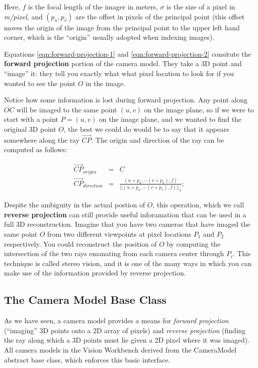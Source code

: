 Here, $f$ is the focal length of the imager in meters, $\sigma$ is the
size of a pixel in {\em m/pixel}, and $(p_u, p_v)$ are the offset in
pixels of the principal point (this offset moves the origin of the
image from the principal point to the upper left hand corner, which is
the ``origin'' usually adopted when indexing images).  

Equations \ref{eqn:forward-projection-1} and
\ref{eqn:forward-projection-2} consitute the {\bf forward projection}
portion of the camera model.  They take a 3D point and ``image'' it:
they tell you exactly what what pixel location to look for if you
wanted to see the point $O$ in the image.  

Notice how some information is lost during forward projection.  Any
point along $\overline{OC}$ will be imaged to the same point $(u,v)$
on the image plane, so if we were to start with a point $P=(u,v)$ on
the image plane, and we wanted to find the original 3D point $O$, the
best we could do would be to say that it appears somewhere along the
ray $\overrightarrow{CP}$. The
origin and direction of the ray can be computed as follows:

\begin{eqnarray}
\label{eqn:reverse-projection-1}
\overrightarrow{CP}_{origin} & = & C \\
\label{eqn:forward-projection-2}
\overrightarrow{CP}_{direction} & = & \frac{(u + p_u, -(v + p_v), f)} {||(u + p_u, -(v + p_v), f)||_2};
\end{eqnarray}

Despite the ambiguity in the actual postion of $O$, this operation,
which we call {\bf reverse projection} can still provide useful
inforamation that can be used in a full 3D reconstruction. Imagine
that you have two cameras that have imaged the same point $O$ from two
different viewpoints at pixel locations $P_1$ and $P_2$ respectively.
You could reconstruct the position of $O$ by computing the
intersection of the two rays emanating from each camera center through
$P_i$.  This technique is called stereo vision, and it is one of the
many ways in which you can make use of the information provided by
reverse projection.

\subsection{The Camera Model Base Class}

As we have seen, a camera model provides a means for {\em forward
  projection} (``imaging'' 3D points onto a 2D array of pixels) and
{\em reverse projection} (finding the ray along which a 3D points must
lie given a 2D pixel where it was imaged).  All camera models in the
Vision Workbench derived from the CameraModel abstract base class,
which enforces this basic interface.    

